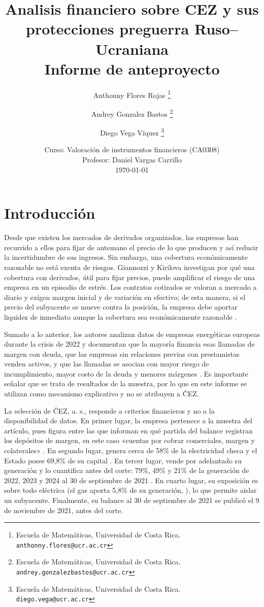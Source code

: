 \documentclass[11pt,letterpaper]{article}
\title{
    \textbf{Analisis financiero sobre CEZ y sus protecciones preguerra Ruso--Ucraniana}\\[0.4em]
    \large Informe de anteproyecto
}
\author{%
    {Anthonny Flores Rojas}
    \thanks{
        Escuela de Matemáticas,
        Universidad de Costa Rica.
        \texttt{anthonny.flores@ucr.ac.cr}
    }
    \and
    {Andrey Gonzalez Bastos}
    \thanks{
        Escuela de Matemáticas,
        Universidad de Costa Rica.
        \texttt{andrey.gonzalezbastos@ucr.ac.cr}
    }
    \and
    {Diego Vega Víquez}
    \thanks{
        Escuela de Matemáticas,
        Universidad de Costa Rica.
        \texttt{diego.vega@ucr.ac.cr}
    }
}
\date{
    Curso: Valoración de instrumentos financieros (CA0308)\\
    Profesor: Daniel Vargas Carrillo\\[0.3em]
    \today
}
\theoremstyle{plain}
\theoremstyle{definition}
\theoremstyle{remark}
\numberwithin{equation}{section}
\begin{document}
	
	
	\maketitle

	\tableofcontents   %

	\newpage
	

\section{Introducción}\label{sec:intro}

Desde que existen los mercados de derivados organizados, las empresas han recurrido a ellos para fijar de antemano el precio de lo que producen y así reducir la incertidumbre de sus ingresos. Sin embargo, una cobertura económicamente razonable no está exenta de riesgos. Giannozzi y Kirilova \parencite{GIANNOZZI2026107700} investigan por qué una cobertura con derivados, útil para fijar precios, puede amplificar el riesgo de una empresa en un episodio de estrés. Los contratos cotizados se valoran a mercado a diario y exigen margen inicial y de variación en efectivo; de esta manera, si el precio del subyacente se mueve contra la posición, la empresa debe aportar liquidez de inmediato aunque la cobertura sea económicamente razonable \parencite[p.~1]{GIANNOZZI2026107700}.

Sumado a lo anterior, los autores analizan datos de empresas energéticas europeas durante la crisis de 2022 y documentan que la mayoría financia esas llamadas de margen con deuda, que las empresas sin relaciones previas con prestamistas venden activos, y que las llamadas se asocian con mayor riesgo de incumplimiento, mayor costo de la deuda y menores márgenes \parencite[p.~1]{GIANNOZZI2026107700}. Es importante señalar que se trata de resultados de la muestra, por lo que en este informe se utilizan como mecanismo explicativo y no se atribuyen a ČEZ.

La selección de ČEZ, a. s., responde a criterios financieros y no a la disponibilidad de datos. En primer lugar, la empresa pertenece a la muestra del artículo, pues figura entre las que informan en qué partida del balance registran los depósitos de margen, en este caso «cuentas por cobrar comerciales, margen y colaterales» \parencite[Apéndice A3, p.~16]{GIANNOZZI2026107700}. En segundo lugar, genera cerca de 58\% de la electricidad checa \parencite[p.~11]{cez_fs_2021} y el Estado posee 69,8\% de su capital \parencite[p.~10]{cez_interim_q3_2021}. En tercer lugar, vende por adelantado su generación y lo cuantifica antes del corte: 79\%, 49\% y 21\% de la generación de 2022, 2023 y 2024 al 30 de septiembre de 2021 \parencite[p.~27]{cez_interim_q3_2021}. En cuarto lugar, su exposición es sobre todo eléctrica (el gas aporta 5,8\% de su generación, \parencite{cez_story_2022}), lo que permite aislar un subyacente. Finalmente, su balance al 30 de septiembre de 2021 se publicó el 9 de noviembre de 2021, antes del corte.
\end{document}
